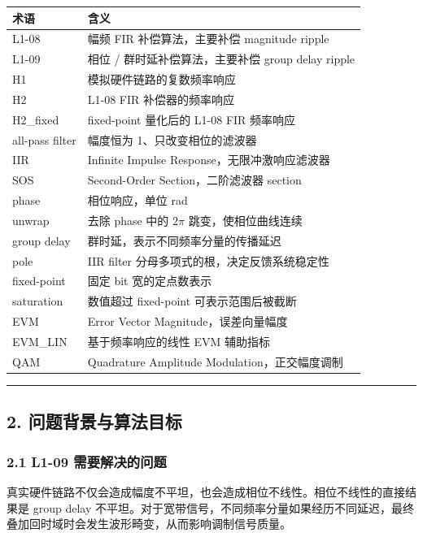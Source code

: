 \documentclass[
]{ctexart}
\begin{document}
\begin{longtable}[]{@{}ll@{}}
\toprule\noalign{}
术语 & 含义 \\
\midrule\noalign{}
\endhead
\bottomrule\noalign{}
\endlastfoot
L1-08 & 幅频 FIR 补偿算法，主要补偿 magnitude ripple \\
L1-09 & 相位 / 群时延补偿算法，主要补偿 group delay ripple \\
H1 & 模拟硬件链路的复数频率响应 \\
H2 & L1-08 FIR 补偿器的频率响应 \\
H2\_fixed & fixed-point 量化后的 L1-08 FIR 频率响应 \\
all-pass filter & 幅度恒为 1、只改变相位的滤波器 \\
IIR & Infinite Impulse Response，无限冲激响应滤波器 \\
SOS & Second-Order Section，二阶滤波器 section \\
phase & 相位响应，单位 rad \\
unwrap & 去除 phase 中的 \(2\pi\) 跳变，使相位曲线连续 \\
group delay & 群时延，表示不同频率分量的传播延迟 \\
pole & IIR filter 分母多项式的根，决定反馈系统稳定性 \\
fixed-point & 固定 bit 宽的定点数表示 \\
saturation & 数值超过 fixed-point 可表示范围后被截断 \\
EVM & Error Vector Magnitude，误差向量幅度 \\
EVM\_LIN & 基于频率响应的线性 EVM 辅助指标 \\
QAM & Quadrature Amplitude Modulation，正交幅度调制 \\
\end{longtable}

\begin{center}\rule{0.5\linewidth}{0.5pt}\end{center}

\subsection{2.
问题背景与算法目标}\label{ux95eeux9898ux80ccux666fux4e0eux7b97ux6cd5ux76eeux6807}

\subsubsection{2.1 L1-09
需要解决的问题}\label{l1-09-ux9700ux8981ux89e3ux51b3ux7684ux95eeux9898}

真实硬件链路不仅会造成幅度不平坦，也会造成相位不线性。相位不线性的直接结果是
group delay
不平坦。对于宽带信号，不同频率分量如果经历不同延迟，最终叠加回时域时会发生波形畸变，从而影响调制信号质量。
\end{document}
